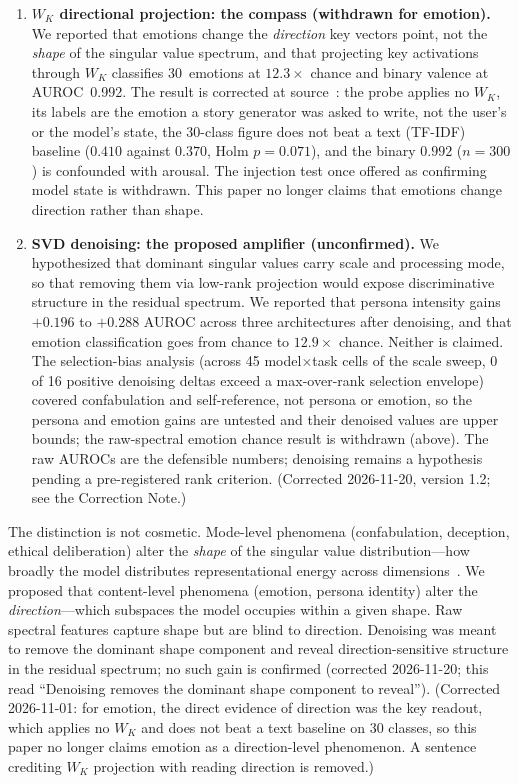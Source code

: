 \documentclass[11pt,a4paper]{article}
\begin{document}
\begin{enumerate}[nosep]
    \item \textbf{$W_K$ directional projection: the compass (withdrawn for
    emotion).} We reported that emotions change the \emph{direction} key
    vectors point, not the \emph{shape} of the singular value spectrum, and
    that projecting key activations through $W_K$ classifies 30~emotions at
    $12.3\times$ chance and binary valence at AUROC~0.992. The result is corrected at source~\citep{lyra_p4}: the probe applies no $W_K$, its
    labels are the emotion a story generator was asked to write, not the
    user's or the model's state, the 30-class figure does not beat a text
    (TF-IDF) baseline ($0.410$ against $0.370$, Holm $p = 0.071$), and the
    binary $0.992$ ($n = 300$) is confounded with arousal. The injection test
    once offered as confirming model state is withdrawn. This paper no
    longer claims that emotions change direction rather than shape.

    \item \textbf{SVD denoising: the proposed amplifier (unconfirmed).} We
    hypothesized that dominant singular values carry scale and processing
    mode, so that removing them via low-rank projection would expose
    discriminative structure in the residual spectrum. We reported that
    persona intensity gains $+0.196$ to $+0.288$ AUROC across three
    architectures after denoising, and that emotion classification goes
    from chance to $12.9\times$ chance. Neither is claimed. The
    selection-bias analysis (across 45 model$\times$task cells of the scale
    sweep, 0 of 16 positive denoising deltas exceed a max-over-rank
    selection envelope) covered confabulation and self-reference, not
    persona or emotion, so the persona and emotion gains are untested and
    their denoised values are upper bounds; the raw-spectral emotion chance
    result is withdrawn (above). The raw AUROCs are the defensible numbers;
    denoising remains a hypothesis pending a pre-registered rank criterion.
    (Corrected 2026-11-20, version 1.2; see the Correction Note.)
\end{enumerate}

The distinction is not cosmetic. Mode-level phenomena (confabulation,
deception, ethical deliberation) alter the \emph{shape} of the singular value
distribution---how broadly the model distributes representational energy
across dimensions~\citep{lyra_spectral}. We proposed that content-level
phenomena (emotion, persona identity) alter the \emph{direction}---which
subspaces the model occupies within a given shape. Raw spectral features
capture shape but are blind to direction. Denoising was meant to remove the
dominant shape component and reveal direction-sensitive structure in the
residual spectrum; no such gain is confirmed (corrected 2026-11-20; this read
``Denoising removes the dominant shape component to reveal''). (Corrected 2026-11-01: for emotion, the direct evidence of
direction was the key readout, which applies no $W_K$ and does not beat a
text baseline on 30 classes, so this paper no longer claims emotion as a
direction-level phenomenon. A sentence crediting $W_K$ projection with
reading direction is removed.)
\end{document}
